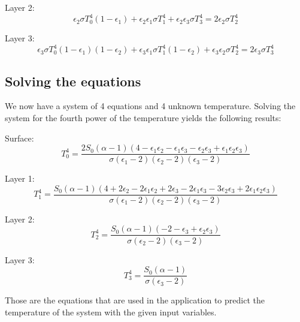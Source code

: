 \documentclass[a4paper,12pt]{article}
\begin{document}
Layer 2:
\begin{equation}
    \epsilon_2 \sigma T_0^4 (1-\epsilon_1) + \epsilon_2 \epsilon_1 \sigma T_1^4 + \epsilon_2 \epsilon_3 \sigma T_3^4 = 2\epsilon_2 \sigma T_2^4
\end{equation}

Layer 3:
\begin{equation}
    \epsilon_3 \sigma T_0^4 (1-\epsilon_1) (1-\epsilon_2) + \epsilon_3 \epsilon_1 \sigma T_1^4(1-\epsilon_2)+\epsilon_3\epsilon_2\sigma T_2^4 = 2 \epsilon_3 \sigma T_3^4
\end{equation}

\subsection*{Solving the equations}

We now have a system of 4 equations and 4 unknown temperature. Solving the system for the fourth power of the temperature yields the following results:\newline

Surface:
\begin{equation}
    T_0^4=\frac{2S_0(\alpha-1)(4-\epsilon_1 \epsilon_2 - \epsilon_1 \epsilon_3 - \epsilon_2 \epsilon_3 + \epsilon_1 \epsilon_2 \epsilon_3)}{\sigma(\epsilon_1-2)(\epsilon_2-2)(\epsilon_3-2)}
\end{equation}

Layer 1:
\begin{equation}
    T_1^4=\frac{S_0(\alpha-1)(4+2\epsilon_2 -2\epsilon_1 \epsilon_2 + 2\epsilon_3 - 2\epsilon_1 \epsilon_3 -3 \epsilon_2 \epsilon_3 + 2\epsilon_1 \epsilon_2 \epsilon_3)}{\sigma(\epsilon_1-2)(\epsilon_2-2)(\epsilon_3-2)}
\end{equation}

Layer 2:
\begin{equation}
    T_2^4=\frac{S_0(\alpha-1)(-2-\epsilon_3+\epsilon_2\epsilon_3)}{\sigma(\epsilon_2-2)(\epsilon_3-2)}
\end{equation}

Layer 3:
\begin{equation}
    T_3^4 = \frac{S_0(\alpha-1)}{\sigma(\epsilon_3-2)}
\end{equation}

Those are the equations that are used in the application to predict the temperature of the system with the given input variables.
\end{document}
